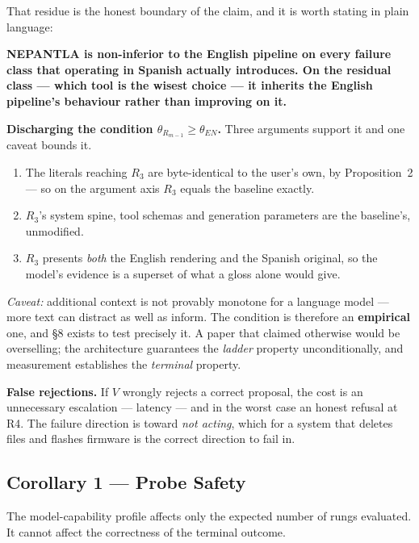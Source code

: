 That residue is the honest boundary of the claim, and it is worth stating in
plain language:

\begin{keyinsight}
\textbf{NEPANTLA is non-inferior to the English pipeline on every failure class
that operating in Spanish actually introduces. On the residual class --- which
tool is the wisest choice --- it inherits the English pipeline's behaviour
rather than improving on it.}
\end{keyinsight}

\textbf{Discharging the condition $\theta_{R_{m-1}} \ge \theta_{EN}$.} Three
arguments support it and one caveat bounds it.

\begin{enumerate}[label=(\roman*), leftmargin=*]
  \item The literals reaching $R_3$ are byte-identical to the user's own, by
        Proposition~2 --- so on the argument axis $R_3$ equals the baseline
        exactly.
  \item $R_3$'s system spine, tool schemas and generation parameters are the
        baseline's, unmodified.
  \item $R_3$ presents \emph{both} the English rendering and the Spanish
        original, so the model's evidence is a superset of what a gloss alone
        would give.
\end{enumerate}

\emph{Caveat:} additional context is not provably monotone for a language model
--- more text can distract as well as inform. The condition is therefore an
\textbf{empirical} one, and \S8 exists to test precisely it. A paper that
claimed otherwise would be overselling; the architecture guarantees the
\emph{ladder} property unconditionally, and measurement establishes the
\emph{terminal} property.

\textbf{False rejections.} If $V$ wrongly rejects a correct proposal, the cost
is an unnecessary escalation --- latency --- and in the worst case an honest
refusal at R4. The failure direction is toward \emph{not acting}, which for a
system that deletes files and flashes firmware is the correct direction to fail
in.

\subsection{Corollary 1 --- Probe Safety}
\label{sec:probe-safety}

\setcounter{theorem}{0}
\begin{corollary}
\label{cor:probe-safety}
The model-capability profile affects only the expected number of rungs
evaluated. It cannot affect the correctness of the terminal outcome.
\end{corollary}

